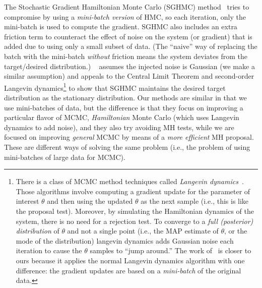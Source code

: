 \documentclass{article}
\begin{document}
The Stochastic Gradient Hamiltonian Monte Carlo (SGHMC) method~ \cite{sghmc_2014} tries to
compromise by using a \emph{mini-batch version} of HMC, so each iteration, only the mini-batch is
used to compute the gradient.  SGHMC also includes an extra friction term to counteract the effect
of noise on the system (or gradient) that is added due to using only a small subset of data. (The
``naive'' way of replacing the batch with the mini-batch \emph{without} friction means the system
deviates from the target/desired distribution.) ~\cite{sghmc_2014} assumes the injected noise is
Gaussian (we make a similar assumption) and appeals to the Central Limit Theorem and second-order
Langevin dynamics\footnote{There is a class of MCMC method techniques called \emph{Langevin
dynamics}~\cite{mcmc_hamiltonian_2010}. Those algorithms involve computing a gradient update for the
parameter of interest $\theta$ and then using the updated $\theta$ as the next sample (i.e., this is
like the proposal test). Moreover, by simulating the Hamiltonian dynamics of the system, there is no
need for a rejection test. To converge to a \emph{full (posterior) distribution} of $\theta$ and not
a single point (i.e., the MAP estimate of $\theta$, or the mode of the distribution) langevin
dynamics adds Gaussian noise each iteration to cause the $\theta$ samples to ``jump around.'' The
work of~\cite{langevin_2011} is closer to ours because it applies the normal Langevin dynamics
algorithm with one difference: the gradient updates are based on a \emph{mini-batch} of the original
data.} to show that SGHMC maintains the desired target distribution as the stationary distribution.
Our methods are similar in that we use mini-batches of data, but the difference is that they focus
on improving a particular flavor of MCMC, \emph{Hamiltonian} Monte Carlo (which uses Langevin
dynamics to add noise), and they also try avoiding MH tests, while we are focused on improving
\emph{general} MCMC by means of a \emph{more efficient} MH proposal. These are different ways of
solving the same problem (i.e., the problem of using mini-batches of large data for MCMC).
\end{document}

